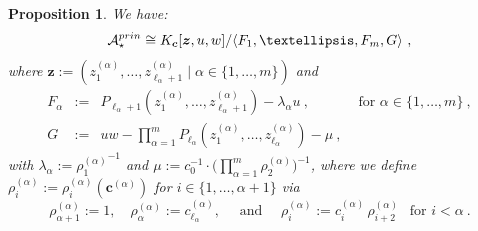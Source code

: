 \documentclass[10pt,a4paper]{amsart}
\newtheorem{prop}{Proposition}
\newcommand{\KK}{\ensuremath{K}} %
\renewcommand{\c}{{\boldsymbol{c}}}
\newcommand{\cA}{\mathcal{A}}
\newcommand{\len}{\ell}
\newcommand{\prin}{{\rm prin}}
\newcommand{\z}{\boldsymbol{z}}
\begin{document}
\begin{prop}
	\label{Prop:NewPresentation}
	We have: 
	\[
	\cA_\star^\prin 
	\cong 
	\KK_\c[\z, u , w ]
	/
	\langle 
	F_1, \ldots, F_m, G
	\rangle
	\ , 
	\]
	where $ \z := ( z_1^{(\alpha)}, \ldots, z_{\len_\alpha + 1}^{(\alpha)} \mid \alpha \in \{ 1, \ldots, m \}) $
	and
	\[
	\begin{array}{rcll}
		F_\alpha 
		& := & 
		P_{\len_\alpha +1} (z_1^{(\alpha)}, \ldots, z_{\len_\alpha + 1}^{(\alpha)}) 
		- \lambda_\alpha u
		\ , 
		& \mbox{ for } \alpha \in \{ 1, \ldots, m \} \ , 
		\\[10pt]
		G 
		& := &
		\displaystyle 
		u w - 
		\prod_{\alpha=1}^m P_{\len_\alpha} (z_1^{(\alpha)},  \ldots, z_{\len_\alpha}^{(\alpha)}) - \mu 
		\ ,
	\end{array} 
	\]
	with
	$ \lambda_\alpha := {\rho_{1}^{(\alpha)}}^{-1} $
	and
	$ \displaystyle  \mu := c_0^{-1} \cdot \Big( \prod_{\alpha=1}^m 
	\rho_{2}^{(\alpha)} \Big)^{-1} $,
	where we define $ \rho_i^{(\alpha)} := \rho_i^{(\alpha)}(\c^{(\alpha)}) $ for $ i \in \{ 1, \ldots, \alpha+1 \} $ via
	\[ %
		\rho_{\alpha+1}^{(\alpha)} := 1 
		,
		\quad  
		\rho_{\alpha}^{(\alpha)} := c_{\len_\alpha}^{(\alpha)} 
		,
		\quad
		\mbox{ and } 
		\quad 
		\rho_i^{(\alpha)} := c_{i}^{(\alpha)}
		\, \rho_{i+2}^{(\alpha)}
		\ \ 
		\mbox{ for } i < \alpha 
		\ . 
	\] %
\end{prop}
\end{document}
